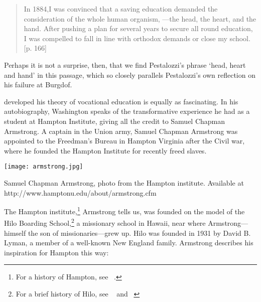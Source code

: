 \begin{quote}

In 1884,I was convinced that a saving education demanded the consideration of the whole human organism, ---the head, the heart, and the hand. After pushing a plan for several years to secure all round education, I was compelled to fall in line with orthodox demands or close my school. [p. 166]
\end{quote}

Perhaps it is not a surprise, then, that we find Pestalozzi's phrase `head, heart and hand' in this passage, which so closely parallels Pestalozzi's own reflection on his failure at Burgdof.

 developed his theory of vocational education is equally as fascinating. In his autobiography, Washington speaks of the transformative experience he had as a student at Hampton Institute, giving all the credit to Samuel Chapman Armstrong. A captain in the Union army, Samuel Chapman Armstrong was appointed to the Freedman's Bureau in Hampton Virginia after the Civil war, where he founded the Hampton Institute for recently freed slaves.\begin{marginfigure}\texttt{[image: armstrong.jpg]}\caption{Samuel Chapman Armstrong, photo from the Hampton institute. Available at http://www.hamptonu.edu/about/armstrong.cfm}\label{fig:armstrong}\end{marginfigure} 

The Hampton institute,\footnote{For a history of Hampton, see ~\citep{Jackson:1925br}.} Armstrong tells us, was founded on the model of the Hilo Boarding School,\footnote{For a brief history of Hilo, see ~\citep{Beyer:2004ud} and ~\citep{Canevali:1977wq}} a missionary school in Hawaii, near where Armstrong---himself the son of missionaries---grew up. Hilo was founded in 1931 by David B. Lyman, a member of a well-known New England family. Armstrong describes his inspiration for Hampton this way:

